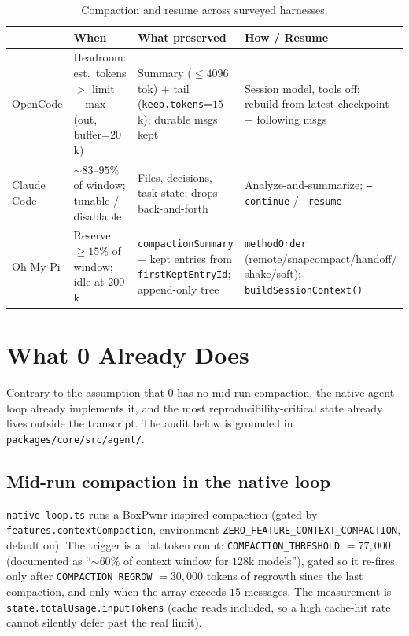 \documentclass[11pt]{article}
\begin{document}
\begin{table}[t]
\centering
\small
\begin{tabular}{@{}p{2.0cm}p{3.4cm}p{3.4cm}p{3.4cm}@{}}
\toprule
 & \textbf{When} & \textbf{What preserved} & \textbf{How / Resume} \\
\midrule
OpenCode &
Headroom: est.\ tokens $>$ limit $-\max$(out, buffer=$20$k) &
Summary ($\le 4096$ tok) $+$ tail (\texttt{keep.tokens}=$15$k); durable msgs kept &
Session model, tools off; rebuild from latest checkpoint $+$ following msgs \\
\addlinespace
Claude Code &
$\sim 83$--$95\%$ of window; tunable / disablable &
Files, decisions, task state; drops back-and-forth &
Analyze-and-summarize; \texttt{--continue} / \texttt{--resume} \\
\addlinespace
Oh My Pi &
Reserve $\ge 15\%$ of window; idle at $200$k &
\texttt{compactionSummary} $+$ kept entries from \texttt{firstKeptEntryId}; append-only tree &
\texttt{methodOrder} (remote/snapcompact/handoff/ shake/soft); \texttt{buildSessionContext()} \\
\bottomrule
\end{tabular}
\caption{Compaction and resume across surveyed harnesses.}
\label{tab:survey}
\end{table}

\section{What 0 Already Does}

Contrary to the assumption that 0 has no mid-run compaction, the native agent
loop already implements it, and the most reproducibility-critical state already
lives outside the transcript. The audit below is grounded in
\texttt{packages/core/src/agent/}.

\subsection{Mid-run compaction in the native loop}

\texttt{native-loop.ts} runs a BoxPwnr-inspired compaction (gated by
\texttt{features.contextCompaction}, environment
\texttt{ZERO\_FEATURE\_CONTEXT\_COMPACTION}, default on). The trigger is a flat
token count: \texttt{COMPACTION\_THRESHOLD} $=77{,}000$ (documented as ``$\sim
60\%$ of context window for $128$k models''), gated so it re-fires only after
\texttt{COMPACTION\_REGROW} $=30{,}000$ tokens of regrowth since the last
compaction, and only when the array exceeds $15$ messages. The measurement is
\texttt{state.totalUsage.inputTokens} (cache reads included, so a high cache-hit
rate cannot silently defer past the real limit).
\end{document}
